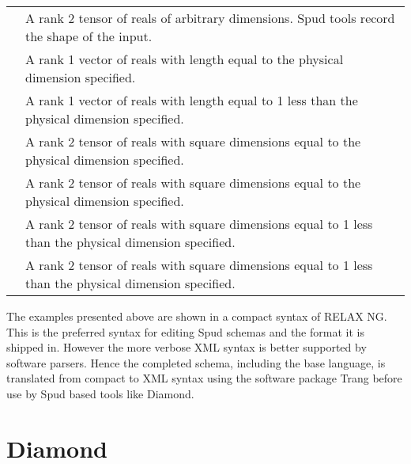 \documentclass[a4paper, 11pt]{book}
\begin{document}
\begin{tabular}{lp{8cm}}
\lstinline *real_tensor* & A rank 2 tensor of reals of arbitrary dimensions.  Spud tools record the shape of the input. \\
\lstinline *real_dim_vector* & A rank 1 vector of reals with length equal to the physical dimension specified. \\
\lstinline *real_dim_minus_one_vector* & A rank 1 vector of reals with length equal to 1 less than the physical dimension specified. \\
\lstinline *real_dim_tensor* & A rank 2 tensor of reals with square dimensions equal to the physical dimension specified. \\
\lstinline *real_dim_symmetric_tensor* & A rank 2 tensor of reals with square dimensions equal to the physical dimension specified. \\
\lstinline *real_dim_minus_one_tensor* & A rank 2 tensor of reals with square dimensions equal to 1 less than the physical dimension specified. \\
\lstinline *real_dim_minus_one_symmetric_tensor* & A rank 2 tensor of reals with square dimensions equal to 1 less than the physical dimension specified.
\end{tabular}

The examples presented above are shown in a compact syntax of RELAX NG.  This is the preferred syntax for editing Spud schemas and the format it is shipped in.   However the more verbose XML syntax is better supported by software parsers.  Hence the completed schema, including the base language, is translated from compact to XML syntax using the software package Trang before use by Spud based tools like Diamond.

\chapter{Diamond}
\end{document}

